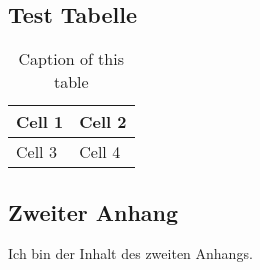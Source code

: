 
\subsection{Test Tabelle}
\begin{table}[h!]
\centering
    \begin{tabular}{l | l}
        Cell 1 & Cell 2 \\ \hline
        Cell 3 & Cell 4
    \end{tabular}
    \caption{Caption of this table}%
    \label{app:firstappendix}   
\end{table}

\subsection{Zweiter Anhang}%
\label{app:secondappendix}

Ich bin der Inhalt des zweiten Anhangs.
